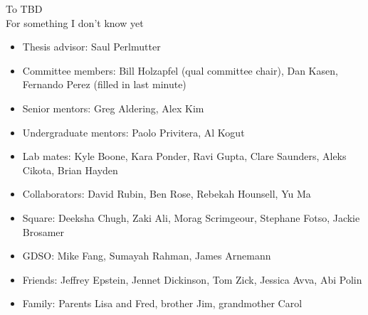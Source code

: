\documentclass{ucbthesis}
\begin{document}
\begin{frontmatter}

\begin{dedication}
\null\vfil
\begin{center}
To TBD \\\vspace{12pt}
For something I don't know yet
\end{center}
\vfil\null
\end{dedication}


\tableofcontents
\clearpage
\listoffigures
\clearpage
\listoftables

\begin{acknowledgements}
\begin{itemize}
    \item Thesis advisor: Saul Perlmutter
    \item Committee members: Bill Holzapfel (qual committee chair), Dan Kasen, Fernando Perez (filled in last minute)
    \item Senior mentors: Greg Aldering, Alex Kim
    \item Undergraduate mentors: Paolo Privitera, Al Kogut
    \item Lab mates: Kyle Boone, Kara Ponder, Ravi Gupta, Clare Saunders, Aleks Cikota, Brian Hayden
    \item Collaborators: David Rubin, Ben Rose, Rebekah Hounsell, Yu Ma
    \item Square: Deeksha Chugh, Zaki Ali, Morag Scrimgeour, Stephane Fotso, Jackie Brosamer
    \item GDSO: Mike Fang, Sumayah Rahman, James Arnemann
    \item Friends: Jeffrey Epstein, Jennet Dickinson, Tom Zick, Jessica Avva, Abi Polin
    \item Family: Parents Lisa and Fred, brother Jim, grandmother Carol
\end{itemize}

\end{acknowledgements}

\end{frontmatter}

\pagestyle{headings}









\printbibliography
\end{document}
